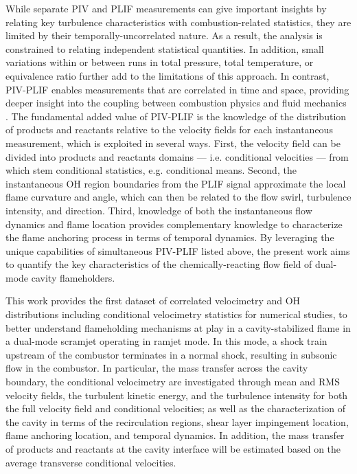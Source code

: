 While separate PIV and PLIF measurements can give important insights by relating key turbulence characteristics with combustion-related statistics, they are limited by their temporally-uncorrelated nature. As a result, the analysis is constrained to relating independent statistical quantities. In addition, small variations within or between runs in total pressure, total temperature, or equivalence ratio further add to the limitations of this approach. In contrast, PIV-PLIF enables measurements that are correlated in time and space, providing deeper insight into the coupling between combustion physics and fluid mechanics \citep{TanahashiMurakamiChoiEtAl2005, GambaClemensEzekoye2013, XavierVandelGodardEtAl2016, FangHong2018}. 
The fundamental added value of PIV-PLIF is the knowledge of the distribution of products and reactants relative to the velocity fields for each instantaneous measurement, which is exploited in several ways. First, the velocity field can be divided into products and reactants domains --- i.e. conditional velocities --- from which stem conditional statistics, e.g. conditional means. 
Second, the instantaneous OH region boundaries from the PLIF signal approximate the local flame curvature and angle, which can then be related to the flow swirl, turbulence intensity, and direction. 
Third, knowledge of both the instantaneous flow dynamics and flame location provides complementary knowledge to characterize the flame anchoring process in terms of temporal dynamics. 
By leveraging the unique capabilities of simultaneous PIV-PLIF listed above, the present work aims to quantify the key characteristics of the chemically-reacting flow field of dual-mode cavity flameholders.

This work provides the first dataset of correlated velocimetry and OH distributions including conditional velocimetry statistics for numerical studies, to better understand flameholding mechanisms at play in a cavity-stabilized flame in a dual-mode scramjet operating in ramjet mode. In this mode, a shock train upstream of the combustor terminates in a normal shock, resulting in subsonic flow in the combustor. In particular, the mass transfer across the cavity boundary, the conditional velocimetry are investigated through mean and RMS velocity fields, the turbulent kinetic energy, and the turbulence intensity for both the full velocity field and conditional velocities; as well as the characterization of the cavity in terms of the recirculation regions,
shear layer impingement location, flame anchoring location, and temporal dynamics. In addition, the mass transfer of products and reactants at the cavity interface will be estimated based on the average transverse conditional velocities. 

